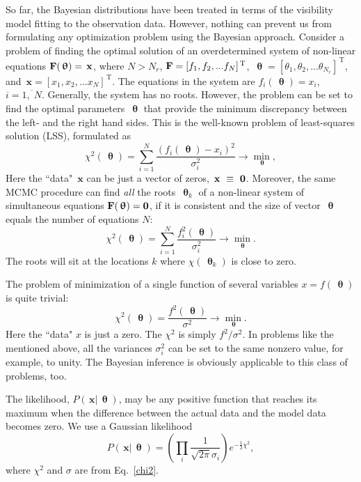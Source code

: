 \documentclass[preprint2]{aastex}
\newcommand{\bfx}{\,\mathbf{x}}
\newcommand{\bfth}{\,\bm{\uptheta}}
\newcommand{\uT}{\,\mathrm{T}}
\begin{document}
So far, the Bayesian distributions have been treated in terms of the visibility model fitting to the observation data. However, nothing can prevent us from formulating any optimization problem using the Bayesian approach. Consider a problem of finding the optimal solution of an overdetermined system of non-linear equations ${\bf F}(\bfth) = \bfx$, where $N > N_r$, ${\bf F} = [f_1, f_2, ... f_N]^{\uT}$, $\bfth = [\theta_1, \theta_2, ... \theta_{N_r}]^{\uT}$, and $\bfx = [x_1, x_2, ... x_N]^{\uT}$. The equations in the system are $f_i(\bfth) = x_i$, $i = \overline{1,\;N}$. Generally, the system has no roots. However, the problem can be set to find the optimal parameters $\bfth$ that provide the minimum discrepancy between the left- and the right hand sides. This is the well-known problem of least-squares solution (LSS), formulated as   
\begin{equation}
  \label{nonlin_sys_opt}
  \chi^2(\bfth) = \sum_{i=1}^{N} \frac{(f_i(\bfth) - x_i)^2}{\sigma_i^2}  \rightarrow {\min\limits_{\bfth}},
\end{equation}
Here the ``data" $\bfx$ can be just a vector of zeros, $\bfx~\equiv~{\bf 0}$. Moreover, the same MCMC procedure can find \emph{all} the roots $\bfth_k$ of a non-linear system of simultaneous equations ${\bf F}(\bfth) = {\bf 0}$, if it is consistent and the size of vector $\bfth$ equals the number of equations $N$:
\begin{equation}
  \label{vec_fun_opt}
  \chi^2(\bfth) = \sum_{i=1}^{N} \frac{f_i^2(\bfth)}{\sigma_i^2}  \rightarrow {\min\limits_{\bfth}}.
\end{equation}
The roots will sit at the locations $k$ where $\chi(\bfth_k)$ is close to zero.

The problem of minimization of a single function of several variables $x = f(\bfth)$ is quite trivial:
\begin{equation}
  \label{single_fun_opt}
  \chi^2(\bfth) =  \frac{f^2(\bfth)}{\sigma^2} \rightarrow {\min\limits_{\bfth}}.
\end{equation}
Here the ``data" $x$ is just a zero. The $\chi^2$ is simply $f^2/\sigma^2$. In problems like the mentioned above, all the variances $\sigma_i^2$ can be set to the same nonzero value, for example, to unity. The Bayesian inference is obviously applicable to this class of problems, too.


The likelihood, $P(\bfx|\bfth)$, may be any positive function that reaches its maximum when the difference between the actual data and the model data becomes zero. We use a Gaussian likelihood
\begin{equation}
  \label{gaussian_likelihood}
  P(\bfx|\bfth) = \left(\prod_i \frac{1}{\sqrt{2 \pi} \sigma_i} \right) e^{-\frac{1}{2}\chi^2},
\end{equation}
where $\chi^2$ and $\sigma$ are from Eq.~\eqref{chi2}.
\end{document}
